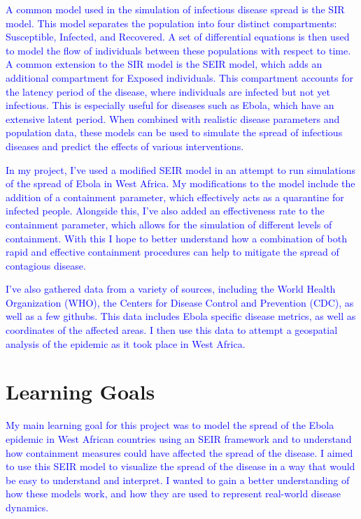 \documentclass[%
 reprint,
superscriptaddress,
 amsmath,amssymb,
 aps,
]{revtex4-2}
\begin{document}
\textcolor{blue}{A common model used in the simulation of infectious disease spread is the SIR model. This model separates the population into four distinct compartments: Susceptible, Infected, and Recovered. A set of differential equations is then used to model the flow of individuals between these populations with respect to time. A common extension to the SIR model is the SEIR model, which adds an additional compartment for Exposed individuals. 
This compartment accounts for the latency period of the disease, where individuals are infected but not yet infectious. This is especially useful for diseases such as Ebola, which have an extensive latent period. When combined with realistic disease parameters and population data, these models can be used to simulate the spread of infectious diseases and predict the effects of various interventions.}

\textcolor{blue}{In my project, I've used a modified SEIR model in an attempt to run simulations of the spread of Ebola in West Africa. My modifications to the model include the addition of a containment parameter, which effectively acts as a quarantine for infected people. Alongside this, I've also added an effectiveness rate to the containment parameter, which allows for the simulation of different levels of containment. 
With this I hope to better understand how a combination of both rapid and effective containment procedures can help to mitigate the spread of contagious disease.}

\textcolor{blue}{I've also gathered data from a variety of sources, including the World Health Organization (WHO), the Centers for Disease Control and Prevention (CDC), as well as a few githubs. This data includes Ebola specific disease metrics, as well as coordinates of the affected areas. I then use this data to attempt a geospatial analysis of the epidemic as it took place in West Africa.}

\section{Learning Goals}

\textcolor{blue}{My main learning goal for this project was to model the spread of the Ebola epidemic in West African countries using an SEIR framework and to understand how containment measures could have affected the spread of the disease. I aimed to use this SEIR model to visualize the spread of the disease in a way that would be easy to understand and interpret. I wanted to gain a better understanding of how these models work, and how they are used to represent real-world disease dynamics.}
\end{document}
